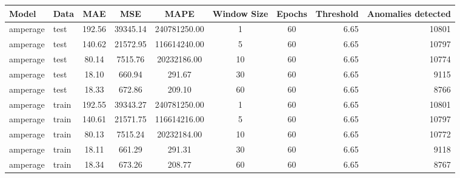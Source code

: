 \begin{tabular}{llcccccrr}
\hline
Model & Data & MAE & MSE & MAPE & Window Size & Epochs & Threshold & Anomalies detected \\
\hline
amperage & test & 192.56 & 39345.14 & 240781250.00 & 1 & 60 & 6.65 & 10801 \\
amperage & test & 140.62 & 21572.95 & 116614240.00 & 5 & 60 & 6.65 & 10797 \\
amperage & test & 80.14 & 7515.76 & 20232186.00 & 10 & 60 & 6.65 & 10774 \\
amperage & test & 18.10 & 660.94 & 291.67 & 30 & 60 & 6.65 & 9115 \\
amperage & test & 18.33 & 672.86 & 209.10 & 60 & 60 & 6.65 & 8766 \\
amperage & train & 192.55 & 39343.27 & 240781250.00 & 1 & 60 & 6.65 & 10801 \\
amperage & train & 140.61 & 21571.75 & 116614216.00 & 5 & 60 & 6.65 & 10797 \\
amperage & train & 80.13 & 7515.24 & 20232184.00 & 10 & 60 & 6.65 & 10772 \\
amperage & train & 18.11 & 661.29 & 291.31 & 30 & 60 & 6.65 & 9118 \\
amperage & train & 18.34 & 673.26 & 208.77 & 60 & 60 & 6.65 & 8767 \\
\hline
\end{tabular}
